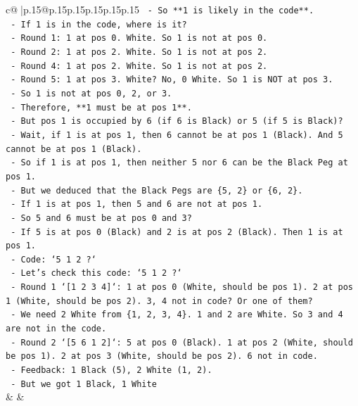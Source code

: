 \documentclass{article}
\begin{document}
{\begin{supertabular}{c@{$\;$}|p{.15\linewidth}@{}p{.15\linewidth}p{.15\linewidth}p{.15\linewidth}p{.15\linewidth}p{.15\linewidth}}
{{{\texttt{            {-} So **1 is likely in the code**.} \\
\texttt{            {-} If 1 is in the code, where is it?} \\
\texttt{                {-} Round 1: 1 at pos 0. White. So 1 is not at pos 0.} \\
\texttt{                {-} Round 2: 1 at pos 2. White. So 1 is not at pos 2.} \\
\texttt{                {-} Round 4: 1 at pos 2. White. So 1 is not at pos 2.} \\
\texttt{                {-} Round 5: 1 at pos 3. White? No, 0 White. So 1 is NOT at pos 3.} \\
\texttt{                {-} So 1 is not at pos 0, 2, or 3.} \\
\texttt{                {-} Therefore, **1 must be at pos 1**.} \\
\texttt{            {-} But pos 1 is occupied by 6 (if 6 is Black) or 5 (if 5 is Black)?} \\
\texttt{            {-} Wait, if 1 is at pos 1, then 6 cannot be at pos 1 (Black). And 5 cannot be at pos 1 (Black).} \\
\texttt{            {-} So if 1 is at pos 1, then neither 5 nor 6 can be the Black Peg at pos 1.} \\
\texttt{            {-} But we deduced that the Black Pegs are \{5, 2\} or \{6, 2\}.} \\
\texttt{            {-} If 1 is at pos 1, then 5 and 6 are not at pos 1.} \\
\texttt{            {-} So 5 and 6 must be at pos 0 and 3?} \\
\texttt{            {-} If 5 is at pos 0 (Black) and 2 is at pos 2 (Black). Then 1 is at pos 1.} \\
\texttt{            {-} Code: `5 1 2 ?`} \\
\texttt{            {-} Let's check this code: `5 1 2 ?`} \\
\texttt{                {-} Round 1 `{[}1 2 3 4{]}`: 1 at pos 0 (White, should be pos 1). 2 at pos 1 (White, should be pos 2). 3, 4 not in code? Or one of them?} \\
\texttt{                {-} We need 2 White from \{1, 2, 3, 4\}. 1 and 2 are White. So 3 and 4 are not in the code.} \\
\texttt{                {-} Round 2 `{[}5 6 1 2{]}`: 5 at pos 0 (Black). 1 at pos 2 (White, should be pos 1). 2 at pos 3 (White, should be pos 2). 6 not in code.} \\
\texttt{                {-} Feedback: 1 Black (5), 2 White (1, 2).} \\
\texttt{                {-} But we got 1 Black, 1 White} \\
            }
        }
    }
    & & \\ \\


\end{supertabular}}
\end{document}
